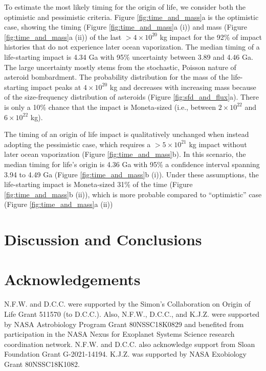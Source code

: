 \documentclass[preprint]{aastex63}
\begin{document}
To estimate the most likely timing for the origin of life, we consider both the \citet{Wogan_2023} optimistic and pessimistic criteria. Figure \ref{fig:time_and_mass}a is the optimistic case, showing the timing (Figure \ref{fig:time_and_mass}a (i)) and mass (Figure \ref{fig:time_and_mass}a (ii)) of the last $> 4 \times 10^{20}$ kg impact for the 92\% of impact histories that do not experience later ocean vaporization. The median timing of a life-starting impact is 4.34 Ga with 95\% uncertainty between 3.89 and 4.46 Ga. The large uncertainty mostly stems from the stochastic, Poisson nature of asteroid bombardment. The probability distribution for the mass of the life-starting impact peaks at $4 \times 10^{20}$ kg and decreases with increasing mass because of the size-frequency distribution of asteroids (Figure \ref{fig:sfd_and_flux}a). There is only a 10\% chance that the impact is Moneta-sized (i.e., between $2 \times 10^{22}$ and $6 \times 10^{22}$ kg).

The timing of an origin of life impact is qualitatively unchanged when instead adopting the \citet{Wogan_2023} pessimistic case, which requires a $> 5 \times 10^{21}$ kg impact without later ocean vaporization (Figure \ref{fig:time_and_mass}b). In this scenario, the median timing for life's origin is 4.36 Ga with 95\% a confidence interval spanning 3.94 to 4.49 Ga (Figure \ref{fig:time_and_mass}b (i)). Under these assumptions, the life-starting impact is Moneta-sized 31\% of the time (Figure \ref{fig:time_and_mass}b (ii)), which is more probable compared to ``optimistic'' case (Figure \ref{fig:time_and_mass}a (ii))

\section{Discussion and Conclusions}

\section*{Acknowledgements}

N.F.W. and D.C.C. were supported by the Simon's Collaboration on Origin of Life Grant 511570 (to D.C.C.). Also, N.F.W., D.C.C., and K.J.Z. were supported by NASA Astrobiology Program Grant 80NSSC18K0829 and benefited from participation in the NASA Nexus for Exoplanet Systems Science research coordination network. N.F.W. and D.C.C. also acknowledge support from Sloan Foundation Grant G-2021-14194. K.J.Z. was supported by NASA Exobiology Grant 80NSSC18K1082.
\end{document}
